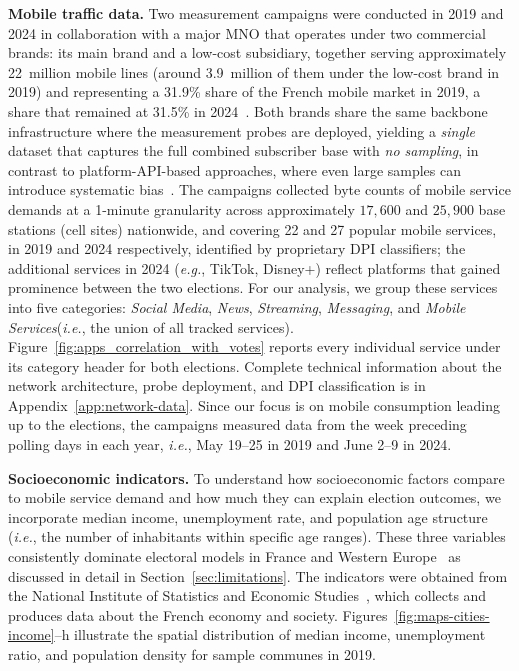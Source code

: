 \documentclass[9pt,sigconf,letterpaper]{acmart}
\newcommand{\eg}{\textit{e.g.},\xspace}
\newcommand{\ie}{\textit{i.e.},\xspace}
\newcommand{\news}{\emph{News}\xspace}
\newcommand{\streaming}{\emph{Streaming}\xspace}
\newcommand{\messaging}{\emph{Messaging}\xspace}
\newcommand{\socialmedia}{\emph{Social Media}\xspace}
\newcommand{\mobile}{\emph{Mobile Services}\xspace}
\begin{document}
\textbf{Mobile traffic data.} Two measurement campaigns were conducted in 2019 and 2024 in collaboration with a major \ac{MNO} that operates under two commercial brands: its main brand and a low-cost subsidiary, together serving approximately 22~million mobile lines (around 3.9~million of them under the low-cost brand in 2019) and representing a 31.9\% share of the French mobile market in 2019, a share that remained at 31.5\% in 2024~\cite{orange2019,orange2024}.
Both brands share the same backbone infrastructure where the measurement probes are deployed, yielding a \textit{single} dataset that captures the full combined subscriber base with \textit{no sampling}, in contrast to platform-API-based approaches, where even large samples can introduce systematic bias~\cite{di2024sampled}.
The campaigns collected byte counts of mobile service demands at a 1-minute granularity across approximately $17{,}600$ and $25{,}900$ base stations (cell sites) nationwide, and covering 22 and 27 popular mobile services, in 2019 and 2024 respectively, identified by proprietary \ac{DPI} classifiers; the additional services in 2024 (\eg TikTok, Disney+) reflect platforms that gained prominence between the two elections.
For our analysis, we group these services into five categories: \socialmedia, \news, \streaming, \messaging, and \mobile (\ie the union of all tracked services).
Figure~\ref{fig:apps_correlation_with_votes} reports every individual service under its category header for both elections.
Complete technical information about the network architecture, probe deployment, and \ac{DPI} classification is in Appendix~\ref{app:network-data}.
Since our focus is on mobile consumption leading up to the elections, the campaigns measured data from the week preceding polling days in each year, \ie May 19--25 in 2019 and June 2--9 in 2024.

\noindent\textbf{Socioeconomic indicators.} To understand how socioeconomic factors compare to mobile service demand and how much they can explain election outcomes, we incorporate median income, unemployment rate, and population age structure (\ie the number of inhabitants within specific age ranges). These three variables consistently dominate electoral models in France and Western Europe~\cite{bolet2020local,gethin2022brahmin,sipma2020contextual} as discussed in detail in Section~\ref{sec:limitations}.
The indicators were obtained from the National Institute of Statistics and Economic Studies~\cite{soc_pop_income_educ_commune}, which collects and produces data about the French economy and society. 
Figures~\ref{fig:maps-cities-income}--h illustrate the spatial distribution of median income, unemployment ratio, and population density for sample communes in 2019.
\end{document}
